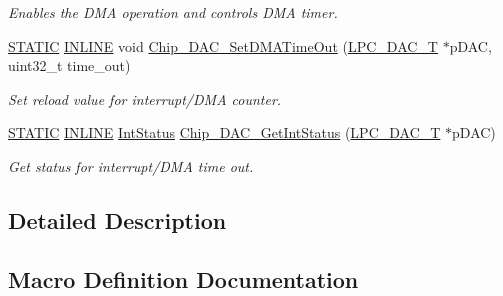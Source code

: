 \begin{DoxyCompactItemize}
\begin{DoxyCompactList}\small\item\em Enables the D\+MA operation and controls D\+MA timer. \end{DoxyCompactList}\item 
\hyperlink{group___l_p_c___types___public___macros_ga10b2d890d871e1489bb02b7e70d9bdfb}{S\+T\+A\+T\+IC} \hyperlink{spifi__18xx__43xx_8h_a2eb6f9e0395b47b8d5e3eeae4fe0c116}{I\+N\+L\+I\+NE} void \hyperlink{group___d_a_c__18_x_x__43_x_x_ga25d6e27e6b906dc2062257175697b438}{Chip\+\_\+\+D\+A\+C\+\_\+\+Set\+D\+M\+A\+Time\+Out} (\hyperlink{struct_l_p_c___d_a_c___t}{L\+P\+C\+\_\+\+D\+A\+C\+\_\+T} $\ast$p\+D\+AC, uint32\+\_\+t time\+\_\+out)
\begin{DoxyCompactList}\small\item\em Set reload value for interrupt/\+D\+MA counter. \end{DoxyCompactList}\item 
\hyperlink{group___l_p_c___types___public___macros_ga10b2d890d871e1489bb02b7e70d9bdfb}{S\+T\+A\+T\+IC} \hyperlink{spifi__18xx__43xx_8h_a2eb6f9e0395b47b8d5e3eeae4fe0c116}{I\+N\+L\+I\+NE} \hyperlink{group___l_p_c___types___public___types_gab7d263072f745b4f3913fb0afc434c4e}{Int\+Status} \hyperlink{group___d_a_c__18_x_x__43_x_x_ga22cbef1d579da4780f4fb330107eb7cb}{Chip\+\_\+\+D\+A\+C\+\_\+\+Get\+Int\+Status} (\hyperlink{struct_l_p_c___d_a_c___t}{L\+P\+C\+\_\+\+D\+A\+C\+\_\+T} $\ast$p\+D\+AC)
\begin{DoxyCompactList}\small\item\em Get status for interrupt/\+D\+MA time out. \end{DoxyCompactList}\end{DoxyCompactItemize}


\subsection{Detailed Description}


\subsection{Macro Definition Documentation}
\mbox{\label{group___d_a_c__18_x_x__43_x_x_gabdfe0f0d61a206418a2ffdba26653873}} 

